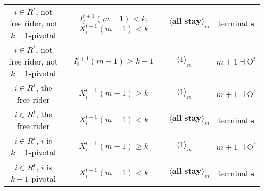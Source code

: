 \documentclass[12pt,letter]{article}
\newcommand{\Omicron}{\mathrm{O}}
\theoremstyle{definition}
\theoremstyle{remark}
\theoremstyle{claim}
\begin{document}
\begin{landscape}
\begin{table}[!htbp]
\begin{center}
\begin{tabular}{c c | c | c | c}
$i\in R^t$, not free rider, not $k-1$-pivotal		 	&  $I^{t+1}_i(m-1)< k$, $X^{t+1}_i(m-1)<k$			&  $\langle \textbf{all stay} \rangle_m$	& 									  & terminal \textbf{s} \\
$i\in R^t$, not free rider, not $k-1$-pivotal	 	&  $I^{t+1}_i(m-1)\geq k-1$			& $\langle 1 \rangle_m$ 	& 									  & $m+1\dashv \Omicron^t$ \\
$i\in R^t$, the free rider  	&  $X^{t+1}_i(m-1)\geq k$ & $\langle 1 \rangle_m$ 		& 				  & $m+1\dashv \Omicron^t$ \\
$i\in R^t$, the free rider  	&  		$X^{t+1}_i(m-1)<k$					&  $\langle \textbf{all stay} \rangle_m$		& 										  & terminal \textbf{s} \\
$i\in R^t$, $i$ is $k-1$-pivotal  	&  $X^{t+1}_i(m-1)\geq k$ & $\langle 1 \rangle_m$ 	& 											 & $m+1\dashv \Omicron^t$ \\
$i\in R^t$, $i$ is $k-1$-pivotal  	&  	$X^{t+1}_i(m-1)<k$		&  $\langle \textbf{all stay} \rangle_m$	& 											 & terminal \textbf{s} \\
\hline
\end{tabular}
\end{center}
\end{table}


\end{landscape}
\clearpage
\end{document}
